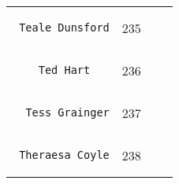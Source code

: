 \documentclass[]{article}
\begin{document}
\begin{longtable}[c]{@{}llll@{}}
\begin{minipage}[t]{0.39\columnwidth}
\begin{verbatim}
 Teale Dunsford
\end{verbatim}
\end{minipage} & \begin{minipage}[t]{0.10\columnwidth}\raggedright
235
\end{minipage} & \begin{minipage}[t]{0.13\columnwidth}\raggedright
\end{minipage} & \begin{minipage}[t]{0.15\columnwidth}\raggedright
\end{minipage}
\\\noalign{\medskip}
\begin{minipage}[t]{0.39\columnwidth}\raggedright
\begin{verbatim}
    Ted Hart
\end{verbatim}
\end{minipage} & \begin{minipage}[t]{0.10\columnwidth}\raggedright
236
\end{minipage} & \begin{minipage}[t]{0.13\columnwidth}\raggedright
\end{minipage} & \begin{minipage}[t]{0.15\columnwidth}\raggedright
\end{minipage}
\\\noalign{\medskip}
\begin{minipage}[t]{0.39\columnwidth}\raggedright
\begin{verbatim}
  Tess Grainger
\end{verbatim}
\end{minipage} & \begin{minipage}[t]{0.10\columnwidth}\raggedright
237
\end{minipage} & \begin{minipage}[t]{0.13\columnwidth}\raggedright
\end{minipage} & \begin{minipage}[t]{0.15\columnwidth}\raggedright
\end{minipage}
\\\noalign{\medskip}
\begin{minipage}[t]{0.39\columnwidth}\raggedright
\begin{verbatim}
 Theraesa Coyle
\end{verbatim}
\end{minipage} & \begin{minipage}[t]{0.10\columnwidth}\raggedright
238
\end{minipage} & \begin{minipage}[t]{0.13\columnwidth}\raggedright

\end{minipage}
\end{longtable}
\end{document}

